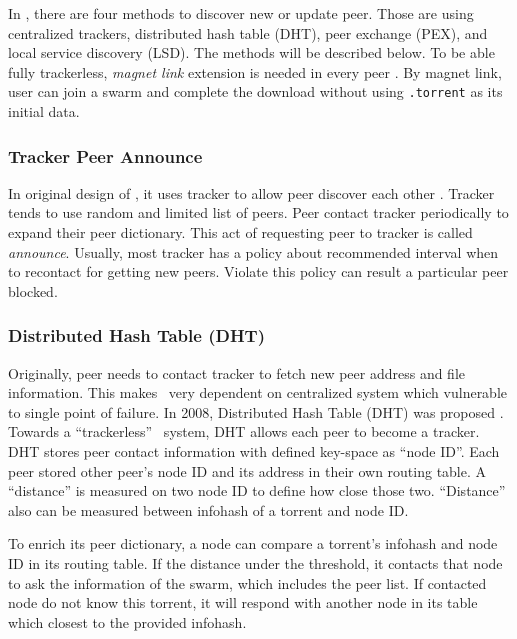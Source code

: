 In \bt, there are four methods to discover new or update peer. Those are using centralized trackers, distributed hash table (DHT), peer exchange (PEX), and local service discovery (LSD). The methods will be described below. To be able fully trackerless, \textit{magnet link} extension is needed in every peer \cite{2008:magnet:hazel}. By magnet link, user can join a swarm and complete the download without using \texttt{.torrent} as its initial data. 

\subsubsection{Tracker Peer Announce}
In original design of \bt, it uses tracker to allow peer discover each other \cite{2003:bittorrent:cohen}. Tracker tends to use random and limited list of peers. Peer contact tracker periodically to expand their peer dictionary. This act of requesting peer to tracker is called \textit{announce}.	Usually, most tracker has a policy about recommended interval when to recontact for getting new peers. Violate this policy can result a particular peer blocked.	

\subsubsection{Distributed Hash Table (DHT)}
Originally, peer needs to contact tracker to fetch new peer address and file information. This makes \bt~very dependent on centralized system which vulnerable to single point of failure. In 2008, Distributed Hash Table (DHT) was proposed \cite{2008:dht:loewenstern}. Towards a ``trackerless'' \bt~system, DHT allows each peer to become a tracker. DHT stores peer contact information with defined key-space as ``node ID''. Each peer stored other peer's node ID and its address in their own routing table. A ``distance'' is measured on two node ID to define how close those two. ``Distance'' also can be measured between infohash of a torrent and node ID.

To enrich its peer dictionary, a node can compare a torrent's infohash and node ID in its routing table. If the distance under the threshold, it contacts that node to ask the information of the swarm, which includes the peer list. If contacted node do not know this torrent, it will respond with another node in its table which closest to the provided infohash. 

